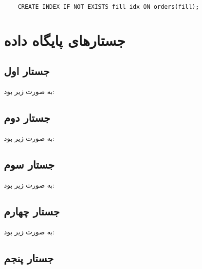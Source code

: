 \documentclass{book}
\begin{document}
\begin{latin}
    \begin{verbatim}
    CREATE INDEX IF NOT EXISTS fill_idx ON orders(fill);
    \end{verbatim}
\end{latin}

\section{جستارهای پایگاه داده}

\subsection{جستار اول}

به صورت زیر بود:

\begin{latin}

\end{latin}

\subsection{جستار دوم}

به صورت زیر بود:

\begin{latin}
    \footnotesize

\end{latin}

\subsection{جستار سوم}

به صورت زیر بود:

\begin{latin}
    \footnotesize

\end{latin}

\subsection{جستار چهارم}

به صورت زیر بود:

\begin{latin}
    \footnotesize

\end{latin}

\subsection{جستار پنجم}
\end{document}
